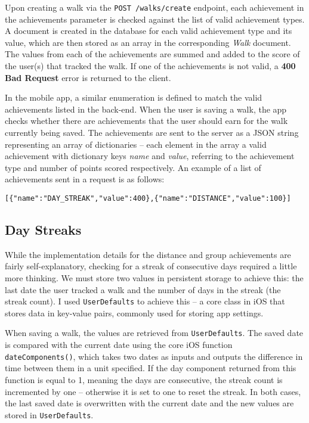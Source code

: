 Upon creating a walk via the \texttt{POST /walks/create} endpoint, each achievement in the achievements parameter is checked against the list of valid achievement types. A document is created in the database for each valid achievement type and its value, which are then stored as an array in the corresponding \textit{Walk} document. The values from each of the achievements are summed and added to the score of the user(s) that tracked the walk. If one of the achievements is not valid, a \textbf{400 Bad Request} error is returned to the client.

In the mobile app, a similar enumeration is defined to match the valid achievements listed in the back-end. When the user is saving a walk, the app checks whether there are achievements that the user should earn for the walk currently being saved. The achievements are sent to the server as a JSON string representing an array of dictionaries -- each element in the array a valid achievement with dictionary keys \textit{name} and \textit{value}, referring to the achievement type and number of points scored respectively. An example of a list of achievements sent in a request is as follows:

\begin{center}
  \verb|[{"name":"DAY_STREAK","value":400},{"name":"DISTANCE","value":100}]|
\end{center}


\subsection{Day Streaks}

While the implementation details for the distance and group achievements are fairly self-explanatory, checking for a streak of consecutive days required a little more thinking. We must store two values in persistent storage to achieve this: the last date the user tracked a walk and the number of days in the streak (the streak count). I used \verb|UserDefaults| to achieve this -- a core class in iOS that stores data in key-value pairs, commonly used for storing app settings.

When saving a walk, the values are retrieved from \verb|UserDefaults|. The saved date is compared with the current date using the core iOS function \verb|dateComponents()|, which takes two dates as inputs and outputs the difference in time between them in a unit specified. If the day component returned from this function is equal to 1, meaning the days are consecutive, the streak count is incremented by one -- otherwise it is set to one to reset the streak. In both cases, the last saved date is overwritten with the current date and the new values are stored in \verb|UserDefaults|.


